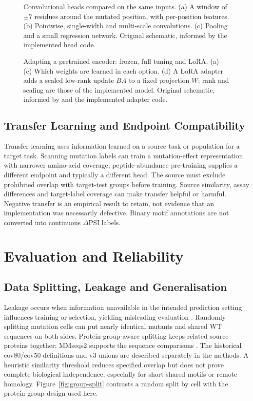 \begin{figure}[htbp]
  \centering
  
  \caption[Convolutional heads compared on the same inputs]{Convolutional heads compared on the same inputs. (a) A window of $\pm7$ residues around the mutated position, with per-position features. (b) Pointwise, single-width and multi-scale convolutions. (c) Pooling and a small regression network. Original schematic, informed by the implemented head code.}
  \label{fig:conv-heads}
\end{figure}


\begin{figure}[htbp]
  \centering
  
  \caption[Adapting a pretrained encoder: frozen, full tuning and LoRA]{Adapting a pretrained encoder: frozen, full tuning and LoRA. (a)--(c) Which weights are learned in each option. (d) A LoRA adapter adds a scaled low-rank update $BA$ to a fixed projection $W$; rank and scaling are those of the implemented model. Original schematic, informed by \citep{hu2022lora} and the implemented adapter code.}
  \label{fig:adaptation-lora}
\end{figure}

\subsection{Transfer Learning and Endpoint Compatibility}
Transfer learning uses information learned on a source task or population for a target task. Scanning
mutation labels can train a mutation-effect representation with narrower amino-acid coverage;
peptide-abundance pre-training supplies a different endpoint and typically a different head. The
source must exclude prohibited overlap with target-test groups before training. Source similarity,
assay differences and target-label coverage can make transfer helpful or harmful. Negative transfer
is an empirical result to retain, not evidence that an implementation was necessarily defective.
Binary motif annotations are not converted into continuous $\Delta$PSI labels.

\section{Evaluation and Reliability}
\subsection{Data Splitting, Leakage and Generalisation}
Leakage occurs when information unavailable in the intended prediction setting influences training or
selection, yielding misleading evaluation \citep{bernett2024}. Randomly splitting mutation cells can
put nearly identical mutants and shared WT sequences on both sides. Protein-group-aware splitting
keeps related source proteins together; MMseqs2 supports the sequence comparisons
\citep{steinegger2017}. The historical cov80/cov50 definitions and v3 unions are described separately
in the methods. A heuristic similarity threshold reduces specified overlap but does not prove complete
biological independence, especially for short shared motifs or remote homology.
Figure~\ref{fig:group-split} contrasts a random split by cell with the protein-group design used here.

